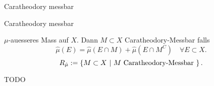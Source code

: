 \documentclass[class=article, crop=false]{standalone}
\begin{document}
\begin{zettel}{Caratheodory messbar}
\begin{flashcard}[vpx494sk]{Caratheodory messbar}
	\begin{definition}
		$\mu$-auesseres Mass auf $X$. Dann $M \subset  X$ Caratheodory-Messbar falls
		\[
			\hat{\mu }(E) = \hat{\mu } ( E \cap M) + \hat{\mu } (E \cap M^C) \quad \forall E \subset X
		.\]
		\[
			R_{\hat{\mu }} := \set{M \subset  X}{M \tx{Caratheodory-Messbar} }
		.\]
	\end{definition}
\end{flashcard}

\begin{lemma}[Eigenschaften]
	TODO
\end{lemma}
\end{zettel}
\end{document}
